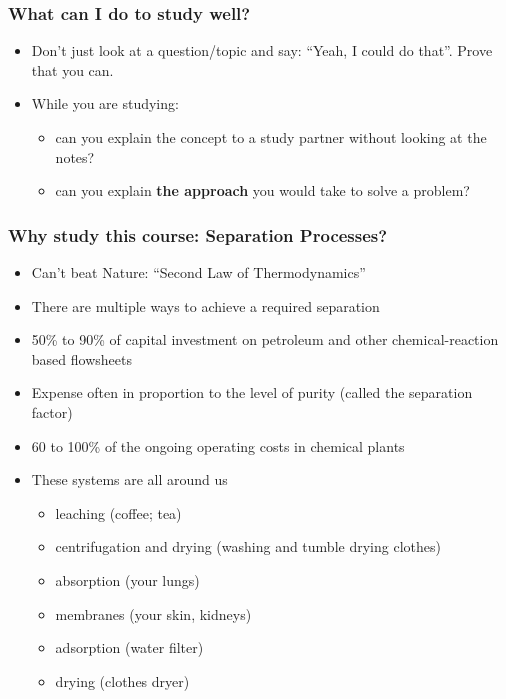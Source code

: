 \begin{frame}\frametitle{What can I do to study well?}
	\textbf{{}}
	\begin{itemize}
		\item	Don't just look at a question/topic and say: ``Yeah, I could do that''. {\color{blue}Prove that you can.}
		\item	While you are studying:
			\begin{itemize}
				\item	can you explain the concept to a study partner without looking at the notes?
				\item	can you explain \textbf{the approach} you would take to solve a problem?
			\end{itemize}
	\end{itemize}
\end{frame}

\begin{frame}\frametitle{Why study this course: Separation Processes?}
	\begin{itemize}
		\item	Can't beat Nature: ``Second Law of Thermodynamics''
		\item	There are multiple ways to achieve a required separation
		\item	50\% to 90\% of capital investment on petroleum and other chemical-reaction based flowsheets 
		\item	Expense often in proportion to the level of purity (called the separation factor) %
		\item	60 to 100\% of the ongoing operating costs in chemical plants  %
		\item	These systems are all around us
		\begin{itemize}
			\item	leaching (coffee; tea)
			\item	centrifugation and drying (washing and tumble drying clothes)
			\item	absorption (your lungs)
			\item	membranes (your skin, kidneys)
			\item	adsorption (water filter)
			\item	drying (clothes dryer)
		\end{itemize}
	\end{itemize}
\end{frame}

